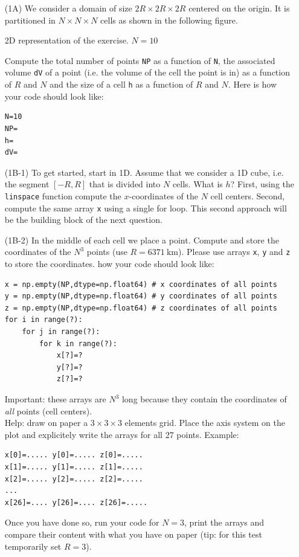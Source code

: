 \begin{itemize}
\item[(1A)] We consider a domain of size $2R\times 2R \times 2R$ centered on the origin. It is 
partitioned in $N\times N \times N$ cells as shown in the following figure.

\begin{center}

{\captionfont 2D representation of the exercise. $N=10$}
\end{center}

Compute the total number of points {\tt NP} as a function of {\tt N},
the associated volume {\tt dV} of a point (i.e. the volume of the cell the point is in) 
as a function of $R$ and $N$ and  
the size of a cell {\tt h} as a function of $R$ and $N$. Here is 
how your code should look like:
\begin{lstlisting}
N=10
NP=
h=
dV=
\end{lstlisting}

\item[(1B-1)] To get started, start in 1D. Assume that we consider a 1D cube, i.e. the
segment $[-R,R]$ that is divided into $N$ cells. What is $h$?
First, using the {\tt linspace} function compute the $x$-coordinates of the $N$
cell centers. 
Second, compute the same array {\tt x} using a single for loop. 
This second approach will be the building block of the next question.

\item[(1B-2)] 
In the middle of each cell we place a point. Compute and store the coordinates 
of the $N^3$ points (use $R=6371~\si{\kilo\metre}$). Please use 
arrays {\tt x}, {\tt y} and {\tt z} to store the coordinates.
how your code should look like:
\begin{lstlisting}
x = np.empty(NP,dtype=np.float64) # x coordinates of all points
y = np.empty(NP,dtype=np.float64) # y coordinates of all points
z = np.empty(NP,dtype=np.float64) # z coordinates of all points
for i in range(?):
    for j in range(?):
        for k in range(?):
            x[?]=?
            y[?]=?
            z[?]=?
\end{lstlisting}

Important: these arrays are $N^3$ long because they contain the coordinates 
of {\it all} points (cell centers).\\
Help: draw on paper a $3\times3\times3$ elements grid. Place the axis system 
on the plot and explicitely write the arrays for all 27 points. Example:
\begin{verbatim}
x[0]=..... y[0]=..... z[0]=.....
x[1]=..... y[1]=..... z[1]=.....
x[2]=..... y[2]=..... z[2]=.....
...
x[26]=.... y[26]=.... z[26]=.....
\end{verbatim}
Once you have done so, run your code for $N=3$, print the arrays and 
compare their content with what you 
have on paper (tip: for this test temporarily set $R=3$).



\end{itemize}
